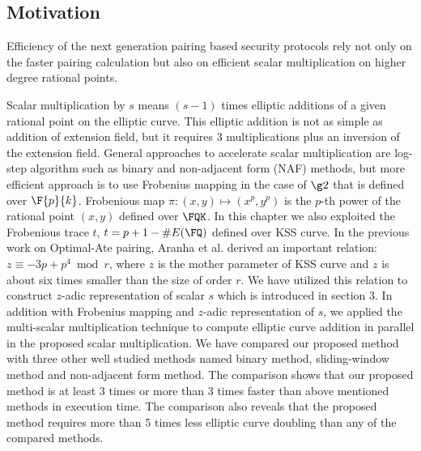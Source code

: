\subsection{Motivation}
Efficiency of the next generation pairing based security protocols rely not only on the faster pairing calculation but also on efficient scalar multiplication on higher degree rational points. 

Scalar multiplication by $s$ means $(s-1)$ times elliptic additions of a given rational point on the elliptic curve. This elliptic addition is not as simple as addition of extension field, but it requires 3 multiplications plus an inversion of the extension field. General approaches to accelerate scalar multiplication are log-step algorithm such as binary and non-adjacent form (NAF) methods, but more efficient approach is to use Frobenius mapping in the case of $\g2$ that is defined over $\F{p}{k}$. Frobenious map $\pi : (x,y) \mapsto  (x^p,y^p)$ is the $p$-th power of the rational point $(x,y)$ defined over $\FQK$. 
In this chapter we also exploited the Frobenious trace $t$, $t = p+1- \#E(\FQ)$ defined over KSS curve. In the previous work on Optimal-Ate pairing, Aranha et al. \cite{PAIRING:AFKMR12} derived an important relation: $z \equiv -3p + p^4 \bmod {r}$, where $z$ is the mother parameter of KSS curve and $z$ is about six times smaller than the size of order $r$. 
We have utilized this relation to construct $z$-adic representation of scalar $s$ which is introduced in section 3. 
In addition with Frobenius mapping and $z$-adic representation of $s$, we applied the multi-scalar multiplication technique to compute elliptic curve addition in parallel in the proposed scalar multiplication.
We have compared our proposed method with three other well studied methods named binary method, sliding-window method and non-adjacent form method. The comparison shows that our proposed method is at least 3 times or more than 3 times faster than above mentioned methods in execution time. The comparison also reveals that the proposed method requires more than 5 times less elliptic curve doubling than any of the compared methods.

